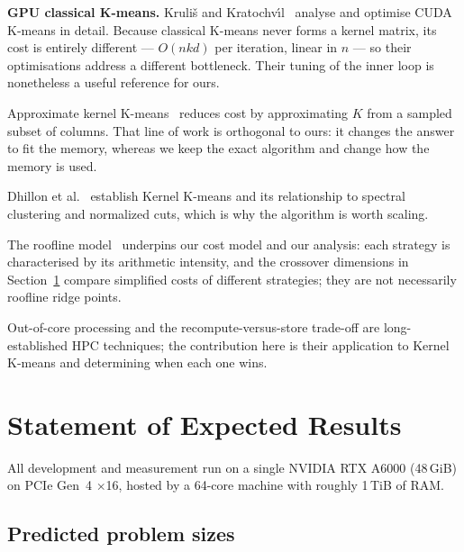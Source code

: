 \documentclass[sigconf]{acmart}
\begin{document}
\textbf{GPU classical K-means.} Kruli\v{s} and
Kratochv\'{\i}l~\cite{krulis2020} analyse and optimise CUDA K-means in detail.
Because classical K-means never forms a kernel matrix, its cost is entirely
different --- $O(nkd)$ per iteration, linear in $n$ --- so their optimisations
address a different bottleneck. Their tuning of the inner loop is nonetheless
a useful reference for ours.

Approximate kernel K-means~\cite{chitta2011} reduces cost by approximating $K$
from a sampled subset of columns. That line of work is orthogonal to ours: it
changes the answer to fit the memory, whereas we keep the exact algorithm and
change how the memory is used.

Dhillon et al.~\cite{dhillon2004} establish Kernel K-means and its relationship
to spectral clustering and normalized cuts, which is why the algorithm is
worth scaling.

The roofline model~\cite{williams2009} underpins our cost model and our
analysis: each strategy is characterised by its arithmetic intensity, and the
crossover dimensions in Section~\ref{sec:expected} compare simplified costs of
different strategies; they are not necessarily roofline ridge points.

Out-of-core processing and the recompute-versus-store trade-off are
long-established HPC techniques; the contribution here is their application to
Kernel K-means and determining when each one wins.

\section{Statement of Expected Results}
\label{sec:expected}

All development and measurement run on a single NVIDIA RTX A6000
(48\,GiB) on PCIe Gen~4 $\times$16, hosted by a 64-core machine with roughly
1\,TiB of RAM.

\subsection{Predicted problem sizes}
\end{document}
